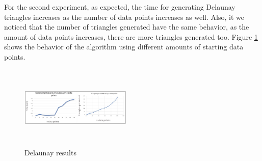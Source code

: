 \documentclass[conference]{IEEEtran}
\begin{document}
For the second experiment, as expected, the time for generating Delaunay triangles increases as the number of data points increases as well. Also, it we noticed that the number of triangles generated have the same behavior, as the amount of data points increases, there are more triangles generated too. Figure \ref{fig:Result2} shows the behavior of the algorithm using different amounts of starting data points.

\begin{figure}[H]
    \centering
    \includegraphics[width=200,height=150,keepaspectratio]{graphs.jpg}
    \caption{Delaunay results}
    \label{fig:Result2}
\end{figure}



\end{document}
